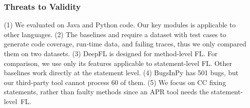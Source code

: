 \subsubsection{Threats to Validity}
(1) We evaluated {\tool} on Java and Python code. Our key modules is
applicable to other languages. (2) The baselines and {\tool}
require a dataset with test cases to generate code coverage,
run-time data, and failing traces, thus we only compared them on two
datasets.
(3) DeepFL is designed for method-level FL. For comparison, we use
only its features applicable to statement-level FL.
Other baselines work directly at the statement level.
(4) BugsInPy has 501 bugs, but our third-party tool cannot process 60
of them. (5) We focus on CC fixing statements, rather than faulty
methods since an APR tool needs the statement-level~FL.



